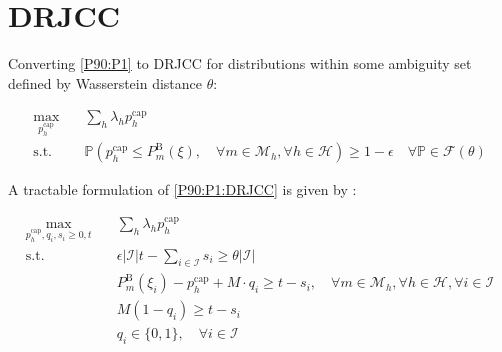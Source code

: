 \documentclass{report}
\begin{document}
\section*{DRJCC}

Converting \eqref{P90:P1} to DRJCC for distributions within some ambiguity set defined by Wasserstein distance $\theta$:

\begin{subequations}\label{P90:P1:DRJCC}
    \begin{align}
        \max_{p_{h}^{\text{cap}}} \quad & \sum_h \lambda_h p_{h}^{\text{cap}}                                                                                                                                                                                                     \\
        \text{s.t.} \quad               & \mathbb{P}  \left( p_{h}^{\text{cap}} \leq P_{m}^{\text{B}}(\xi), \quad \forall{m} \in \mathcal{M}_{h},  \forall{h} \in \mathcal{H}  \right) \geq 1 - \epsilon \quad \forall{\mathbb{P}} \in \mathcal{F}(\theta) \label{P90:p1:drjcc_c}
    \end{align}
\end{subequations}

A tractable formulation of \eqref{P90:P1:DRJCC} is given by \cite[Proposition 2]{chen2022data}:

\begin{subequations}\label{P90:P1:DRJCC-tract}
\begin{align}
    \max_{p_{h}^{\text{cap}}, q_i, s_i \geq 0, t} \quad & \sum_h \lambda_h p_{h}^{\text{cap}}                                                                                                                                    \\
    \text{s.t.} \quad                                   & \epsilon |\mathcal{I}| t - \sum_{i \in \mathcal{I}} s_i \geq \theta |\mathcal{I}|                                                                                      \\
                                                        & P_{m}^{\text{B}}(\xi_i) - p_{h}^{\text{cap}} + M\cdot q_i \geq t - s_i, \quad \forall{m} \in \mathcal{M}_{h},  \forall{h} \in \mathcal{H},  \forall{i} \in \mathcal{I} \\
                                                        & M (1-q_i) \geq t - s_i                                                                                                                                                 \\
                                                        & q_i \in \{0,1 \}, \quad \forall{i} \in \mathcal{I}
\end{align}
\end{subequations}
\end{document}
